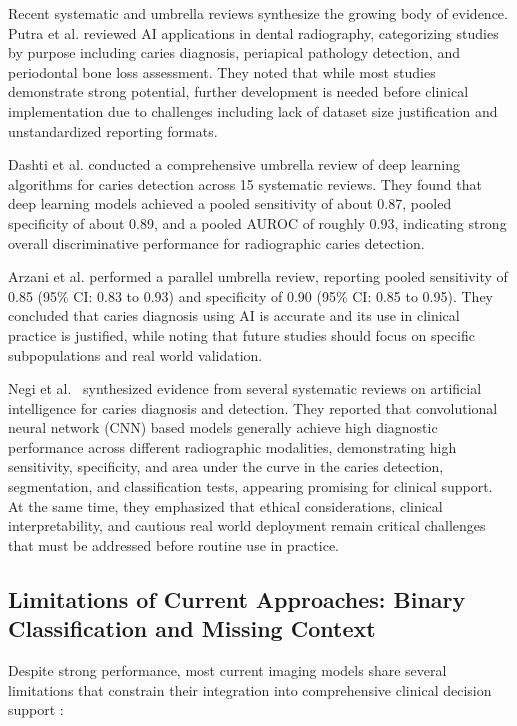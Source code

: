 \documentclass[12pt,a4paper]{report}
\begin{document}
	Recent systematic and umbrella reviews synthesize the growing body of evidence. Putra et al. \cite{putra2021ai_dental_radiography} reviewed AI applications in dental radiography, categorizing studies by purpose including caries diagnosis, periapical pathology detection, and periodontal bone loss assessment. They noted that while most studies demonstrate strong potential, further development is needed before clinical implementation due to challenges including lack of dataset size justification and unstandardized reporting formats.
	
	Dashti et al. \cite{Dashti2024DLCariesUmbrella} conducted a comprehensive umbrella review of deep learning algorithms for caries detection across 15 systematic reviews. They found that deep learning models achieved a pooled sensitivity of about 0.87, pooled specificity of about 0.89, and a pooled AUROC of roughly 0.93, indicating strong overall discriminative performance for radiographic caries detection.
	
	Arzani et al. \cite{Arzani2025AICariesUmbrella} performed a parallel umbrella review, reporting pooled sensitivity of 0.85 (95\% CI: 0.83 to 0.93) and specificity of 0.90 (95\% CI: 0.85 to 0.95). They concluded that caries diagnosis using AI is accurate and its use in clinical practice is justified, while noting that future studies should focus on specific subpopulations and real world validation.
	
	Negi et al.~\cite{negi2025ai_caries_umbrella} synthesized evidence from several systematic reviews on artificial intelligence for caries diagnosis and detection. They reported that convolutional neural network (CNN) based models generally achieve high diagnostic performance across different radiographic modalities, demonstrating high sensitivity, specificity, and area under the curve in the caries detection, segmentation, and classification tests, appearing promising for clinical support. At the same time, they emphasized that
	ethical considerations, clinical interpretability, and cautious real world deployment remain critical challenges that must be addressed before routine use
	in practice.
	
	\subsection{Limitations of Current Approaches: Binary Classification and Missing Context}
	
	Despite strong performance, most current imaging models share several limitations that constrain their integration into comprehensive clinical decision support \cite{schwendicke2020artificial,inchingolo2025ai_dentistry_review,putra2021ai_dental_radiography}:
	
\end{document}
